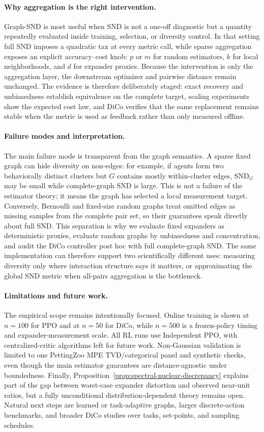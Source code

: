 \documentclass{article}
\theoremstyle{plain}
\theoremstyle{definition}
\theoremstyle{remark}
\newcommand{\SND}{\ensuremath{\mathrm{SND}}}
\newcommand{\SNDG}{\mathrm{SND}_{G}}
\begin{document}
\paragraph{Why aggregation is the right intervention.}
Graph-SND is most useful when SND is not a one-off diagnostic but a
quantity repeatedly evaluated inside training, selection, or diversity
control. In that setting full SND imposes a quadratic tax at every metric
call, while sparse aggregation exposes an explicit accuracy--cost knob:
$p$ or $m$ for random estimators, $k$ for local neighborhoods, and $d$
for expander proxies. Because the intervention is only the aggregation
layer, the downstream optimizer and pairwise distance remain unchanged.
The evidence is therefore deliberately staged: exact recovery and
unbiasedness establish equivalence on the complete target, scaling
experiments show the expected cost law, and DiCo verifies that the same
replacement remains stable when the metric is used as feedback rather
than only measured offline.

\paragraph{Failure modes and interpretation.}
The main failure mode is transparent from the graph semantics. A sparse
fixed graph can hide diversity on non-edges: for example, if agents form
two behaviorally distinct clusters but $G$ contains mostly within-cluster
edges, $\SNDG$ may be small while complete-graph $\SND$ is large. This is
not a failure of the estimator theory; it means the graph has selected a
local measurement target. Conversely, Bernoulli and fixed-size random
graphs treat omitted edges as missing samples from the complete pair set,
so their guarantees speak directly about full SND. This separation is why
we evaluate fixed expanders as deterministic proxies, evaluate random
graphs by unbiasedness and concentration, and audit the DiCo controller
post hoc with full complete-graph SND. The same implementation can
therefore support two scientifically different uses: measuring diversity
only where interaction structure says it matters, or approximating the
global SND metric when all-pairs aggregation is the bottleneck.

\paragraph{Limitations and future work.}
The empirical scope remains intentionally focused. Online training is
shown at $n=100$ for PPO and at $n=50$ for DiCo, while $n=500$ is a
frozen-policy timing and expander-measurement scale. All RL runs use
Independent PPO, with centralized-critic algorithms left for future
work. Non-Gaussian validation is limited to one PettingZoo MPE
TVD/categorical panel and synthetic checks, even though the main
estimator guarantees are distance-agnostic under boundedness. Finally,
Proposition~\ref{prop:spectral-nuclear-discrepancy} explains part of the
gap between worst-case expander distortion and observed near-unit ratios,
but a fully unconditional distribution-dependent theory remains open.
Natural next steps are learned or task-adaptive graphs, larger
discrete-action benchmarks, and broader DiCo studies over tasks,
set-points, and sampling schedules.
\end{document}
